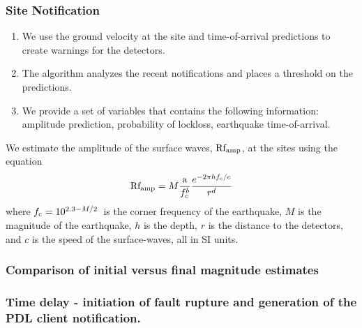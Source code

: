 \documentclass[ignorenonframetext,t,10pt]{beamer}
\begin{document}
\begin{frame}
\frametitle{Site Notification}

  \begin{enumerate}
\item We use the ground velocity at the site and time-of-arrival predictions to create warnings for the detectors.
\item The algorithm analyzes the recent notifications and places a threshold on the predictions.
\item We provide a set of variables that contains the following information: amplitude prediction, probability of lockloss, earthquake time-of-arrival.
  \end{enumerate}
  
We estimate the amplitude of the surface waves, $\rm Rf_{amp}$, at the sites using the equation
\begin{equation}
{\rm Rf_{amp}} = M \frac{\rm a}{f_c^{b}} \frac{e^{-2 \pi h f_{\rm c}/c}}{r^{d}}
\label{eq:Rfamp} 
\end{equation}
where $f_{\rm c} = 10^{2.3-M/2}\,\rm$ is the corner frequency of the earthquake,  $M$ is the magnitude of the earthquake, $h$ is the depth, $r$ is the distance to the detectors, and $c$ is the speed of the surface-waves, all in SI units.  
  
\end{frame}

\begin{frame}
  \frametitle{Comparison of initial versus final magnitude estimates}
\begin{center}
\begin{figure}[hbtp!]
\end{figure}
\end{center}
\end{frame}

\begin{frame}
  \frametitle{Time delay - initiation of fault rupture and generation of the PDL client notification.}
\begin{center}
\begin{figure}[hbtp!]
\end{figure}
\end{center}
\end{frame}
\end{document}
